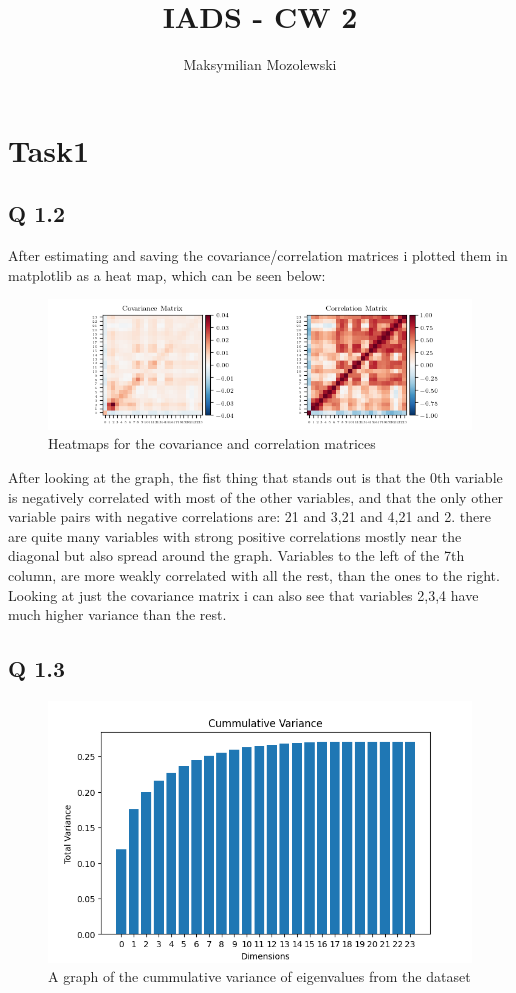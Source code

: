 \documentclass{report}
\begin{document}
\title{IADS - CW 2}
\author{Maksymilian Mozolewski}
\maketitle
\pagebreak
\section{Task1}

\subsection*{Q 1.2}
After estimating and saving the covariance/correlation matrices i plotted them in matplotlib as a heat map, which can be seen below:
\begin{figure}[h]
    \includegraphics[scale=1,left]{Years/Year2/Semester2/Learning/CW/python_code/correlation.png} 
    \caption{Heatmaps for the covariance and correlation matrices}
\end{figure}
After looking at the graph, the fist thing that stands out is that the 0th variable is negatively correlated with most of the other variables, and that the only other variable pairs with negative correlations are: 21 and 3,21 and 4,21 and 2. there are quite many variables with strong positive correlations mostly near the diagonal but also spread around the graph. Variables to the left of the 7th column, are more weakly correlated with all the rest, than the ones to the right. Looking at just the covariance matrix i can also see that variables 2,3,4 have much higher variance than the rest.
\subsection*{Q 1.3}

\begin{figure}[h]
    \includegraphics{Years/Year2/Semester2/Learning/CW/python_code/cumvar.png}
    \caption{A graph of the cummulative variance of eigenvalues from the dataset}
    \label{fig:my_label}
\end{figure}
\end{document}
